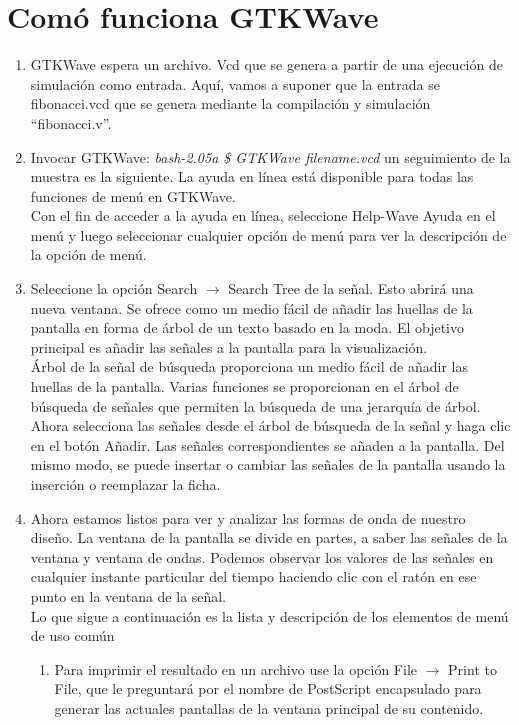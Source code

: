 \documentclass[10pt,graphicx,caption,rotating]{article}
\begin{document}
\section{Comó funciona GTKWave}
\begin{enumerate}
 \item GTKWave espera un archivo. Vcd que se genera a partir de una ejecución de simulación como entrada. Aquí, vamos a suponer que la entrada se fibonacci.vcd que se genera mediante la compilación y simulación ``fibonacci.v''.
 \item Invocar GTKWave: \textit{bash-2.05a \$ GTKWave filename.vcd} un seguimiento de la muestra es la siguiente. La ayuda en línea está disponible para todas las funciones de menú en GTKWave.\\
Con el fin de acceder a la ayuda en línea, seleccione Help-Wave Ayuda en el menú y luego seleccionar cualquier opción de menú para ver la descripción de la opción de menú.
 \item Seleccione la opción Search $\rightarrow$ Search Tree de la señal. Esto abrirá una nueva ventana. Se ofrece como un medio fácil de añadir las huellas de la pantalla en forma de árbol de un texto basado en la moda. El objetivo principal es añadir las señales a la pantalla para la visualización.\\
Árbol de la señal de búsqueda proporciona un medio fácil de añadir las huellas de la pantalla. Varias funciones se proporcionan en el árbol de búsqueda de señales que permiten la búsqueda de una jerarquía de árbol. Ahora selecciona las señales desde el árbol de búsqueda de la señal y haga clic en el botón Añadir. Las señales correspondientes se añaden a la pantalla. Del mismo modo, se puede insertar o cambiar las señales de la pantalla usando la inserción o reemplazar la ficha.
 \item Ahora estamos listos para ver y analizar las formas de onda de nuestro diseño. La ventana de la pantalla se divide en partes, a saber las señales de la ventana y ventana de ondas. Podemos observar los valores de las señales en cualquier instante particular del tiempo haciendo clic con el ratón en ese punto en la ventana de la señal.\\
Lo que sigue a continuación es la lista y descripción de los elementos de menú de uso común
    \begin{enumerate}
     \item Para imprimir el resultado en un archivo use la opción File $\rightarrow$ Print to File, que le preguntará por el nombre de PostScript encapsulado para generar las actuales pantallas de la ventana principal de su contenido.

\end{enumerate}
\end{enumerate}
\end{document}
